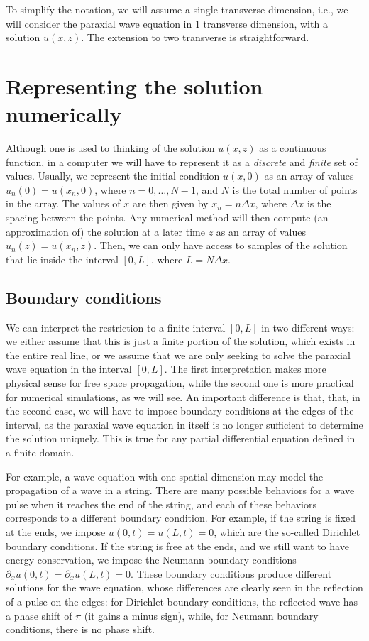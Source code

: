 \documentclass[a4paper,10pt]{report}
\begin{document}
To simplify the notation, we will assume a single transverse dimension, i.e., we will consider the paraxial wave equation in 1 transverse dimension, with a solution $u(x,z)$. The extension to two transverse  is straightforward.

\section{Representing the solution numerically}

Although one is used to thinking of the solution $u(x,z)$ as a continuous function, in a computer we will have to represent it as a \textit{discrete} and \textit{finite} set of values. Usually, we represent the initial condition $u(x,0)$ as an array of values $u_n(0) = u(x_n, 0)$, where $n = 0, \ldots, N-1$, and $N$ is the total number of points in the array. The values of $x$ are then given by $x_n = n \Delta x$, where $\Delta x$ is the spacing between the points. Any numerical method will then compute (an approximation of) the solution at a later time $z$ as an array of values $u_n(z) = u(x_n, z)$. Then, we can only have access to samples of the solution that lie inside the interval $[0, L]$, where $L = N \Delta x$.

\subsection{Boundary conditions}

We can interpret the restriction to a finite interval $[0, L]$ in two different ways: we either assume that this is just a finite portion of the solution, which exists in the entire real line, or we assume that we are only seeking to solve the paraxial wave equation in the interval $[0, L]$. The first interpretation makes more physical sense for free space propagation, while the second one is more practical for numerical simulations, as we will see. An important difference is that, that, in the second case, we will have to impose boundary conditions at the edges of the interval, as the paraxial wave equation in itself is no longer sufficient to determine the solution uniquely. This is true for any partial differential equation defined in a finite domain. 

For example, a wave equation with one spatial dimension may model the propagation of a wave in a string. There are many possible behaviors for a wave pulse when it reaches the end of the string, and each of these behaviors corresponds to a different boundary condition. For example, if the string is fixed at the ends, we impose $u(0,t) = u(L,t) = 0$, which are the so-called Dirichlet boundary conditions. If the string is free at the ends, and we still want to have energy conservation, we impose the Neumann boundary conditions $\partial_x u(0,t) = \partial_x u(L,t) = 0$. These boundary conditions produce different solutions for the wave equation, whose differences are clearly seen in the reflection of a pulse on the edges: for Dirichlet boundary conditions, the reflected wave has a phase shift of $\pi$ (it gains a minus sign), while, for Neumann boundary conditions, there is no phase shift.
\end{document}
